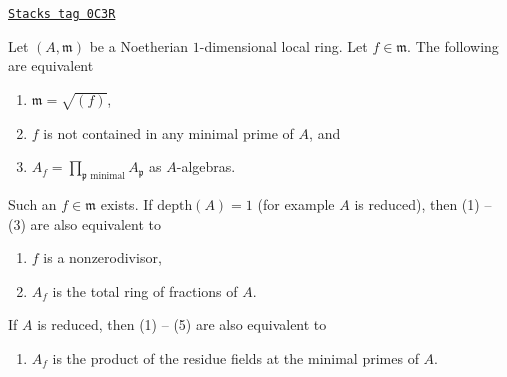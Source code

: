\begin{lemma}
\label{varieties-lemma-pre-pre-delta-invariant}
\href{https://stacks.math.columbia.edu/tag/0C3R}{\texttt{Stacks tag 0C3R}}

Let $(A, \mathfrak m)$ be a Noetherian $1$-dimensional local ring.
Let $f \in \mathfrak m$. The following are equivalent
\begin{enumerate}
\item $\mathfrak m = \sqrt{(f)}$,
\item $f$ is not contained in any minimal prime of $A$, and
\item $A_f = \prod_{\mathfrak p\text{ minimal}} A_\mathfrak p$ as $A$-algebras.
\end{enumerate}
Such an $f \in \mathfrak m$ exists. If $\text{depth}(A) = 1$ (for example
$A$ is reduced), then (1) -- (3) are also equivalent to
\begin{enumerate}
\item[(4)] $f$ is a nonzerodivisor,
\item[(5)] $A_f$ is the total ring of fractions of $A$.
\end{enumerate}
If $A$ is reduced, then (1) -- (5) are also equivalent to
\begin{enumerate}
\item[(6)] $A_f$ is the product of the residue fields at the minimal
primes of $A$.
\end{enumerate}
\end{lemma}


